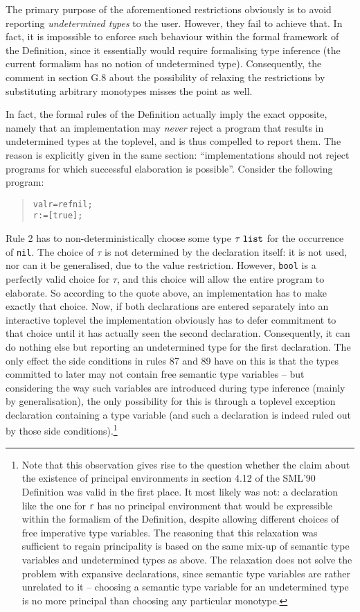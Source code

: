 \documentclass{article}
\begin{document}
The primary purpose of the aforementioned restrictions obviously is to avoid reporting {\em undetermined types} to the user. However, they fail to achieve that. In fact, it is impossible to enforce such behaviour within the formal framework of the Definition, since it essentially would require formalising type inference (the current formalism has no notion of undetermined type). Consequently, the comment in section G.8 about the possibility of relaxing the restrictions by substituting arbitrary monotypes misses the point as well.

In fact, the formal rules of the Definition actually imply the exact opposite, namely that an implementation may {\em never} reject a program that results in undetermined types at the toplevel, and is thus compelled to report them. The reason is explicitly given in the same section: ``implementations should not reject programs for which successful elaboration is possible''. Consider the following program:
\begin{quote}
\begin{alltt}
val r = ref nil;
r := [true];
\end{alltt}
\end{quote}
Rule 2 has to non-deterministically choose some type $\tau\;{\tt list}$ for the occurrence of {\tt nil}. The choice of $\tau$ is not determined by the declaration itself: it is not used, nor can it be generalised, due to the value restriction. However, {\tt bool} is a perfectly valid choice for $\tau$, and this choice will allow the entire program to elaborate. So according to the quote above, an implementation has to make exactly that choice. Now, if both declarations are entered separately into an interactive toplevel the implementation obviously has to defer commitment to that choice until it has actually seen the second declaration. Consequently, it can do nothing else but reporting an undetermined type for the first declaration. The only effect the side conditions in rules 87 and 89 have on this is that the types committed to later may not contain free semantic type variables -- but considering the way such variables are introduced during type inference (mainly by generalisation), the only possibility for this is through a toplevel exception declaration containing a type variable (and such a declaration is indeed ruled out by those side conditions).\footnote{Note that this observation gives rise to the question whether the claim about the existence of principal environments in section 4.12 of the SML'90 Definition \cite{definition90} was valid in the first place. It most likely was not: a declaration like the one for {\tt r} has no principal environment that would be expressible within the formalism of the Definition, despite allowing different choices of free imperative type variables. The reasoning that this relaxation was sufficient to regain principality is based on the same mix-up of semantic type variables and undetermined types as above. The relaxation does not solve the problem with expansive declarations, since semantic type variables are rather unrelated to it -- choosing a semantic type variable for an undetermined type is no more principal than choosing any particular monotype.}
\end{document}
